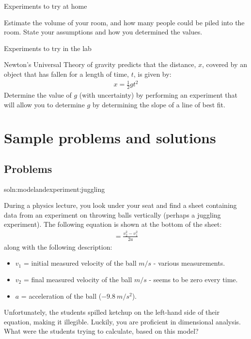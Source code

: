\begin{chapteractivity}{Experiments to try at home}
{
\item Estimate the volume of your room, and how many people could be piled into the room. State your assumptions and how you determined the values.
}
\end{chapteractivity}

\begin{chapteractivity}{Experiments to try in the lab}
{
\item Newton's Universal Theory of gravity predicts that the distance, $x$, covered by an object that has fallen for a length of time, $t$, is given by:
\begin{align*}
x = \frac{1}{2}gt^2
\end{align*}
Determine the value of $g$ (with uncertainty) by performing an experiment that will allow you to determine $g$ by determining the slope of a line of best fit.
}
\end{chapteractivity}


\section{Sample problems and solutions}
\subsection{Problems}
\begin{problem}{soln:modelandexperiment:juggling}{\label{prob:modelandexperiment:juggling}During a physics lecture, you look under your seat and find a sheet containing data from an experiment on throwing balls vertically (perhaps a juggling experiment). The following equation is shown at the bottom of the sheet: 
\begin{align*}
=\frac{v_2^{2}-v_1^{2}}{2a}
\end{align*}
along with the following description: 
\begin{itemize}
\item $v_1$ = initial measured velocity of the ball $\si{m/s}$ - various measurements.
\item $v_2$ = final measured velocity of the ball $\si{m/s}$ - seems to be zero every time.
\item $a$ = acceleration of the ball ($\SI{-9.8}{m/s^2}$).
\end{itemize}
Unfortunately, the students spilled ketchup on the left-hand side of their equation, making it illegible. Luckily, you are proficient in dimensional analysis. What were the students trying to calculate, based on this model?}
\end{problem}

